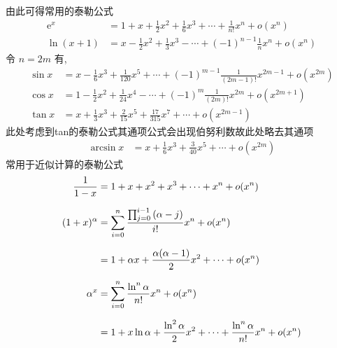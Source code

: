 \documentclass[10pt,a4paper]{article}
\begin{document}
\leftline\small{由此可得常用的泰勒公式}
\begin{align}
    \mathrm{e}^{x} & =1+x+\frac{1}{2}x^{2}+\frac{1}{6}x^{3}+\cdots+\frac{1}{n!}x^{n}+o(x^{n})    \\[7pt]
    \ln(x+1)       & =x-\frac{1}{2}x^2+\frac{1}{3}x^3-\cdots+(-1)^{n-1}\frac{1}{n}x^{n}+o(x^{n})
\end{align}
令 $n=2m$ 有,
\begin{align}
    \sin x & =x-\frac{1}{6}x^{3}+\frac{1}{120}x^{5}+\cdots+(-1)^{m-1}\frac{1}{(2m-1)!}x^{2m-1}+o(x^{2m}) \\[7pt]
    \cos x & =1-\frac{1}{2}x^2+\frac{1}{24}x^4-\cdots+(-1)^m \frac{1}{(2m)!}x^{2m}+o(x^{2m+1})           \\[7pt]
    \tan x & =x+\frac{1}{3}x^3+\frac{2}{15}x^5+\frac{17}{315}x^7+\cdots+o(x^{2m-1})
\end{align}
\small\mbox{此处考虑到tan的泰勒公式其通项公式会出现伯努利数故此处略去其通项 }
\begin{align}
    \arcsin x & =x+\frac{1}{6}x^3+\frac{3}{40}x^{5}+\cdots+o(x^{2m})
\end{align}
常用于近似计算的泰勒公式
\begin{align}
    \frac{1}{1-x}  & =1+x+x^2+x^3+\cdots+x^n+o(x^n)                                                    \\[7pt]
    (1+x)^{\alpha} & =\sum_{i=0}^{n}\frac{\prod_{j=0}^{i-1}{(\alpha-j})}{i!}x^n+o(x^n)\notag           \\[7pt]
                   & =1+\alpha x+\frac{\alpha(\alpha-1)}{2}x^2+\cdots+o(x^n)                           \\[7pt]
    \alpha^x       & =\sum_{i=0}^{n}\frac{\ln^n \alpha}{n!}x^n+o(x^n)\notag                            \\[7pt]
                   & =1+x\ln \alpha+\frac{\ln^2 \alpha}{2}x^2+\cdots+\frac{\ln^n \alpha}{n!}x^n+o(x^n)
\end{align}
\end{document}
